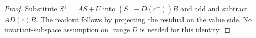 \begin{proof}
Substitute $S^+=AS+U$ into $(S^+-D(c^+))B$ and add and subtract
$AD(c)B$. The readout follows by projecting the residual on the value
side. No invariant-subspace assumption on $\operatorname{range}D$ is
needed for this identity.
\end{proof}
